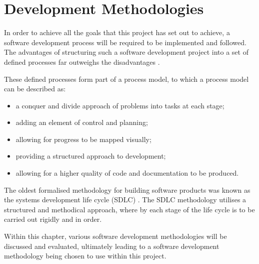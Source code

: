 \chapter{Development Methodologies}

In order to achieve all the goals that this project has set out to achieve, a 
software development process will be required to be implemented and followed. 
The advantages of structuring such a software development project into a set of 
defined processes far outweighs the disadvantages \citep{knott_dawson99}. 

These defined processes form part of a process model, to which a process model 
can be described as:
\begin{itemize}
	\item a conquer and divide approach of problems into tasks at each stage;
	\item adding an element of control and planning;
	\item allowing for progress to be mapped visually;
	\item providing a structured approach to development;
	\item allowing for a higher quality of code and documentation to be produced.
\end{itemize}

The oldest formalised methodology for building software products was known as 
the systems development life cycle (SDLC) \citep{elliott04}. The SDLC
methodology utilises a structured and methodical approach, where by each stage 
of the life cycle is to be carried out rigidly and in order.

Within this chapter, various software development methodologies will be discussed 
and evaluated, ultimately leading to a software development methodology being 
chosen to use within this project.

\newpage


\newpage


\newpage


\newpage


\newpage


\newpage
